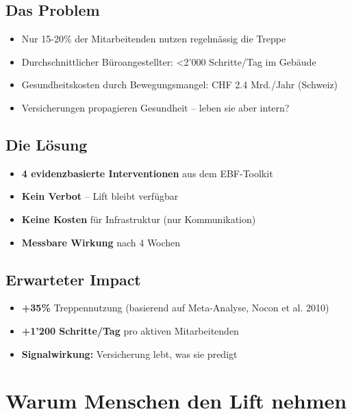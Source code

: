 \documentclass[11pt,a4paper]{article}
\begin{document}
\subsection*{Das Problem}
\begin{itemize}[leftmargin=*]
    \item Nur 15-20\% der Mitarbeitenden nutzen regelmässig die Treppe
    \item Durchschnittlicher Büroangestellter: <2'000 Schritte/Tag im Gebäude
    \item Gesundheitskosten durch Bewegungsmangel: CHF 2.4 Mrd./Jahr (Schweiz)
    \item Versicherungen propagieren Gesundheit -- leben sie aber intern?
\end{itemize}

\subsection*{Die Lösung}
\begin{itemize}[leftmargin=*]
    \item \textbf{4 evidenzbasierte Interventionen} aus dem EBF-Toolkit
    \item \textbf{Kein Verbot} -- Lift bleibt verfügbar
    \item \textbf{Keine Kosten} für Infrastruktur (nur Kommunikation)
    \item \textbf{Messbare Wirkung} nach 4 Wochen
\end{itemize}

\subsection*{Erwarteter Impact}
\begin{itemize}[leftmargin=*]
    \item \textbf{+35\%} Treppennutzung (basierend auf Meta-Analyse, Nocon et al. 2010)
    \item \textbf{+1'200 Schritte/Tag} pro aktiven Mitarbeitenden
    \item \textbf{Signalwirkung:} Versicherung lebt, was sie predigt
\end{itemize}

\newpage

\section{\textcolor{fehrblue}{Warum Menschen den Lift nehmen}}
\end{document}
